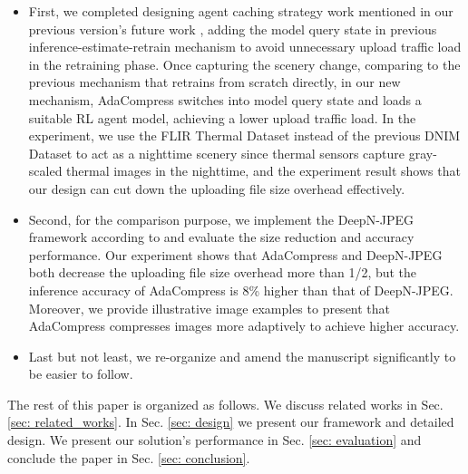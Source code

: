 \begin{itemize}
	\item First, we completed designing agent caching strategy work mentioned in our previous version's future work \cite{2019adacompress}, adding the model query state in previous inference-estimate-retrain mechanism to avoid unnecessary upload traffic load in the retraining phase. Once capturing the scenery change, comparing to the previous mechanism that retrains from scratch directly, in our new mechanism, AdaCompress switches into model query state and loads a suitable RL agent model, achieving a lower upload traffic load. In the experiment, we use the FLIR Thermal Dataset instead of the previous DNIM Dataset to act as a nighttime scenery since thermal sensors capture gray-scaled thermal images in the nighttime, and the experiment result shows that our design can cut down the uploading file size overhead effectively.
	\item Second, for the comparison purpose, we implement the DeepN-JPEG framework according to \cite{DeepN-JPEG} and evaluate the size reduction and accuracy performance. Our experiment shows that AdaCompress and DeepN-JPEG both decrease the uploading file size overhead more than 1/2, but the inference accuracy of AdaCompress is 8\% higher than that of DeepN-JPEG. Moreover, we provide illustrative image examples to present that AdaCompress compresses images more adaptively to achieve higher accuracy.
	\item Last but not least, we re-organize and amend the manuscript significantly to be easier to follow.
\end{itemize}

The rest of this paper is organized as follows. We discuss related works in Sec. \ref{sec: related_works}. In Sec. \ref{sec: design} we present our framework and detailed design. We present our solution's performance in Sec. \ref{sec: evaluation} and conclude the paper in Sec. \ref{sec: conclusion}.


